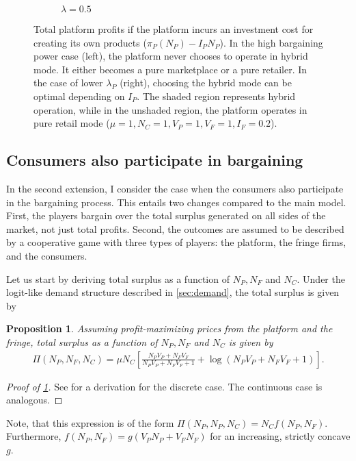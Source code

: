 \documentclass[a4paper]{article}
\newtheorem{proposition}{Proposition}
\begin{document}
\begin{figure}
\begin{subfigure}[b]{0.45\textwidth}
        \caption{$\lambda = 0.5$}
    \end{subfigure}
    \caption{Total platform profits if the platform incurs an investment cost for creating its own products ($\pi_P(N_P) - I_P N_P$). In the high bargaining power case (left), the platform never chooses to operate in hybrid mode. It either becomes a pure marketplace or a pure retailer. In the case of lower $\lambda_P$ (right), choosing the hybrid mode can be optimal depending on $I_P$. The shaded region represents hybrid operation, while in the unshaded region, the platform operates in pure retail mode ($\mu = 1, N_C = 1, V_P = 1, V_F = 1, I_F = 0.2$).}
    \label{fig:equilibrium_low_lambda_entry_fees}
\end{figure}


\subsection{Consumers also participate in bargaining}
\label{sec:two_sided}

In the second extension, I consider the case when the consumers also participate in the bargaining process.
This entails two changes compared to the main model.
First, the players bargain over the total surplus generated on all sides of the market, not just total profits.
Second, the outcomes are assumed to be described by a cooperative game with three types of players: the platform, the fringe firms, and the consumers.

Let us start by deriving total surplus as a function of $N_P, N_F$ and $N_C$.
Under the logit-like demand structure described in \cref{sec:demand}, the total surplus is given by
\begin{proposition}
    \label{prop:profits_total_surplus}
    Assuming profit-maximizing prices from the platform and the fringe, total surplus as a function of $N_P, N_F$ and $N_C$ is given by
    \begin{align*}
        \Pi(N_P, N_F, N_C) = \mu N_C \left[ \frac{N_P V_P + N_F V_F}{N_P V_P + N_F V_F + 1} + \log(N_P V_P + N_F V_F + 1) \right].
    \end{align*}
\end{proposition}
\begin{proof}[Proof of \cref{prop:profits_total_surplus}]
    See \textcite{small1981applied} for a derivation for the discrete case.
    The continuous case is analogous.
\end{proof}
Note, that this expression is of the form $\Pi(N_P, N_P, N_C) = N_C f(N_P, N_F)$.
Furthermore, $f(N_P, N_F) = g(V_P N_P + V_F N_F)$ for an increasing, strictly concave $g$.
\end{document}
